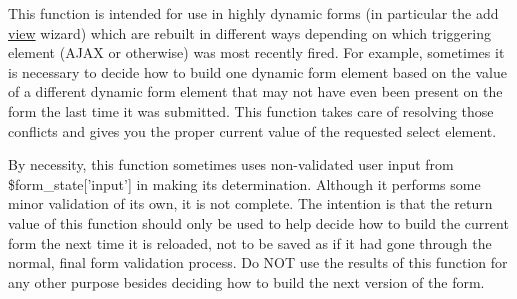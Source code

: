 This function is intended for use in highly dynamic forms (in particular the add \hyperlink{classview}{view} wizard) which are rebuilt in different ways depending on which triggering element (AJAX or otherwise) was most recently fired. For example, sometimes it is necessary to decide how to build one dynamic form element based on the value of a different dynamic form element that may not have even been present on the form the last time it was submitted. This function takes care of resolving those conflicts and gives you the proper current value of the requested select element.

By necessity, this function sometimes uses non-\/validated user input from \$form\_\-state\mbox{[}'input'\mbox{]} in making its determination. Although it performs some minor validation of its own, it is not complete. The intention is that the return value of this function should only be used to help decide how to build the current form the next time it is reloaded, not to be saved as if it had gone through the normal, final form validation process. Do NOT use the results of this function for any other purpose besides deciding how to build the next version of the form.


